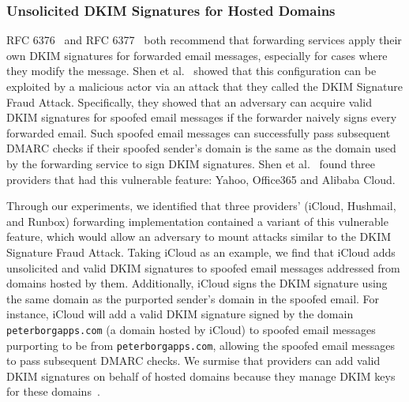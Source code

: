 \subsubsection{Unsolicited DKIM Signatures for Hosted Domains}
\label{subsubsec:unsolicited_dkim}
RFC 6376~\cite{rfc6376} and RFC 6377~\cite{rfc6377} both recommend that
forwarding services apply their own DKIM signatures for forwarded email
messages, especially for cases where they modify the message. 
Shen et al.~\cite{shen2020weak} showed that this configuration can be exploited
by a malicious actor via an attack that they called the DKIM Signature Fraud
Attack.  Specifically, they showed that an adversary can acquire valid DKIM
signatures for spoofed email messages if the forwarder naively signs every
forwarded email. Such spoofed email messages can successfully pass subsequent
DMARC checks if their spoofed sender's domain is the same as the domain used by
the forwarding service to sign DKIM signatures. Shen et al.~\cite{shen2020weak}
found three providers that had this vulnerable feature: Yahoo, Office365 and
Alibaba Cloud.

Through our experiments, we identified that three providers' (iCloud, Hushmail, and Runbox) forwarding implementation contained a variant of this vulnerable feature, which would allow an adversary to mount attacks similar to the DKIM Signature Fraud Attack.
Taking iCloud as an example, we find that iCloud adds unsolicited and valid DKIM signatures to spoofed email messages addressed from domains hosted by them. Additionally,
iCloud signs the DKIM signature using the same domain as the purported sender's domain in the spoofed email. For instance, iCloud will add a valid DKIM signature signed by the domain \texttt{peterborgapps.com} (a domain hosted by iCloud) to spoofed email messages purporting to be from \texttt{peterborgapps.com}, allowing the spoofed email messages to pass subsequent DMARC checks.
We surmise that providers can add valid DKIM signatures on behalf of hosted domains because they manage DKIM keys for these domains~\cite{Setupane66:online, HushDKIM}.





